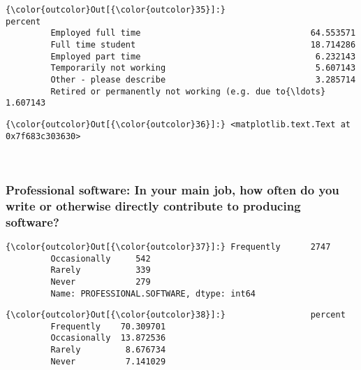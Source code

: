 \documentclass[11pt]{article}
\begin{document}
            \begin{Verbatim}[commandchars=\\\{\}]
{\color{outcolor}Out[{\color{outcolor}35}]:}                                                       percent
         Employed full time                                  64.553571
         Full time student                                   18.714286
         Employed part time                                   6.232143
         Temporarily not working                              5.607143
         Other - please describe                              3.285714
         Retired or permanently not working (e.g. due to{\ldots}   1.607143
\end{Verbatim}
        

            \begin{Verbatim}[commandchars=\\\{\}]
{\color{outcolor}Out[{\color{outcolor}36}]:} <matplotlib.text.Text at 0x7f683c303630>
\end{Verbatim}
        
    \begin{center}
    \end{center}
    { \hspace*{\fill} \\}
    
    \subsubsection{Professional software: In your main job, how often do you
write or otherwise directly contribute to producing
software?}\label{professional-software-in-your-main-job-how-often-do-you-write-or-otherwise-directly-contribute-to-producing-software}


            \begin{Verbatim}[commandchars=\\\{\}]
{\color{outcolor}Out[{\color{outcolor}37}]:} Frequently      2747
         Occasionally     542
         Rarely           339
         Never            279
         Name: PROFESSIONAL.SOFTWARE, dtype: int64
\end{Verbatim}
        

            \begin{Verbatim}[commandchars=\\\{\}]
{\color{outcolor}Out[{\color{outcolor}38}]:}                 percent
         Frequently    70.309701
         Occasionally  13.872536
         Rarely         8.676734
         Never          7.141029
\end{Verbatim}
        
\end{document}
